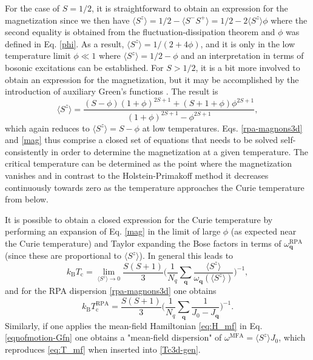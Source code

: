 \documentclass[aps,prb,reprint,floatfix,superscriptaddress]{revtex4-2}
\begin{document}
For the case of $S=1/2$, it is straightforward to obtain an expression for the magnetization since we then have $\langle S^z\rangle=1/2-\langle S^-S^+\rangle=1/2-2\langle S^z\rangle\phi$ where the second equality is obtained from the fluctuation-dissipation theorem and $\phi$ was defined in Eq. \eqref{phi}. As a result, $\langle S^z\rangle=1/(2+4\phi)$, and it is only in the low temperature limit $\phi\ll1$ where $\langle S^z\rangle=1/2-\phi$ and an interpretation in terms of bosonic excitations can be established. For $S>1/2$, it is a bit more involved to obtain an expression for the magnetization, but it may be accomplished by the introduction of auxiliary Green's functions \cite{tahir1962,callen1963}. The result is
\begin{equation}\label{mag}
    \langle S^z \rangle = \frac{(S-\phi)(1+\phi)^{2S+1} + (S+1+\phi)\phi^{2S+1}}{(1+\phi)^{2S+1} - \phi^{2S+1}},
\end{equation}
which again reduces to $\langle S^z\rangle=S-\phi$ at low temperatures. Eqs. \eqref{rpa-magnons3d} and \eqref{mag} thus comprise a closed set of equations that needs to be solved self-consistently in order to determine the magnetization at a given temperature. The critical temperature can be determined as the point where the magnetization vanishes and in contrast to the Holstein-Primakoff method it decreases continuously towards zero as the temperature approaches the Curie temperature from below.

It is possible to obtain a closed expression for the Curie temperature by performing an expansion of Eq. \eqref{mag} in the limit of large $\phi$ (as expected near the Curie temperature) and Taylor expanding the Bose factors in terms of $\omega^\mathrm{RPA}_\mathbf{q}$ (since these are proportional to $\langle S^z\rangle$). In general this leads to 
\begin{equation}\label{Tc3d-gen}
    k_\mathrm{B} T_\mathrm{c} = \lim_{\langle S^z \rangle \rightarrow 0} \frac{S(S+1)}{3} \biggl( \frac{1}{N_q} \sum_{\mathbf{q}} \frac{\langle S^z \rangle}{\omega_{\mathbf{q}}(\langle S^z \rangle)}\biggr )^{-1},
\end{equation}
and for the RPA dispersion \eqref{rpa-magnons3d} one obtains
\begin{equation}\label{Tc3d-rpa}
    k_\mathrm{B} T_\mathrm{c}^\mathrm{RPA} =\frac{S(S+1)}{3} \biggl( \frac{1}{N_q} \sum_{\mathbf{q}} \frac{1}{J_0-J_\mathbf{q}}\biggr )^{-1}.
\end{equation}
Similarly, if one applies the mean-field Hamiltonian \eqref{eq:H_mf} in Eq. \eqref{eqnofmotion-Gfn} one obtains a "mean-field dispersion" of $\omega^\mathrm{MFA}=\langle S^z\rangle J_0$, which reproduces \eqref{eq:T_mf} when inserted into \eqref{Tc3d-gen}.
\end{document}
